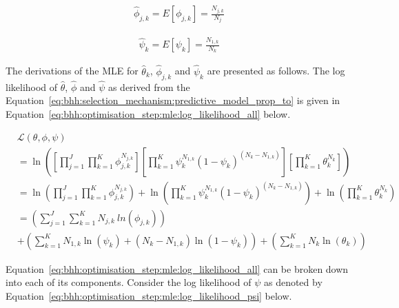 \begin{equation}
      \label{eq:bhh:optimisation_step:mle:phi}
      \begin{split}
            \hat{\phi}_{j,k} = E[\phi_{j,k}] = \frac{N_{j,k}}{N_{j}}
      \end{split}
\end{equation}

\begin{equation}
      \label{eq:bhh:optimisation_step:mle:psi}
      \begin{split}
            \hat{\psi}_{k} = E[\psi_{k}] = \frac{N_{1,k}}{N_{k}}
      \end{split}
\end{equation}

The derivations of the \acs{MLE} for $\hat{\theta}_{k}$, $\hat{\phi}_{j,k}$ and
$\hat{\psi}_{k}$ are presented as follows. The log likelihood of $\hat{\theta}$, $\hat{\phi}$ and $\hat{\psi}$ as derived from the Equation~\eqref{eq:bhh:selection_mechanism:predictive_model_prop_to} is given in Equation~\eqref{eq:bhh:optimisation_step:mle:log_likelihood_all} below.

\begin{equation}
      \label{eq:bhh:optimisation_step:mle:log_likelihood_all}
      \begin{split}
            & \mathcal{L}(\theta, \phi, \psi) \\
            &= \ln\left(\left[ \prod_{j=1}^{J} \prod_{k=1}^{K} \phi_{j,k}^{N_{j,k}} \right] \left[ \prod_{k=1}^{K} \psi_{k}^{N_{1,k}} (1 - \psi_{k})^{(N_{k} - N_{1,k})} \right] \left[ \prod_{k=1}^{K} \theta_{k}^{N_{k}} \right] \right) \\
            &= \ln \left( \prod_{j=1}^{J} \prod_{k=1}^{K} \phi_{j,k}^{N_{j,k}} \right) +  \ln \left( \prod_{k=1}^{K} \psi_{k}^{N_{1,k}} (1 - \psi_{k})^{(N_{k} - N_{1,k})} \right) + \ln \left( \prod_{k=1}^{K} \theta_{k}^{N_{k}} \right) \\
            &= \left( \sum_{j=1}^{J} \sum_{k=1}^{K} N_{j,k} \ ln \left( \phi_{j,k}
            \right) \right) \\
            &+ \left( \sum_{k=1}^{K} N_{1,k} \ln \left( \psi_{k} \right) + \left( N_{k} - N_{1,k} \right) \ln \left( 1 - \psi_{k} \right) \right) + \left( \sum_{k=1}^{K} N_{k} \ln \left( \theta_{k} \right) \right)
      \end{split}
\end{equation}

Equation~\eqref{eq:bhh:optimisation_step:mle:log_likelihood_all} can be broken down into each of its components. Consider the log likelihood of $\psi$ as denoted by Equation~\eqref{eq:bhh:optimisation_step:mle:log_likelihood_psi} below.

